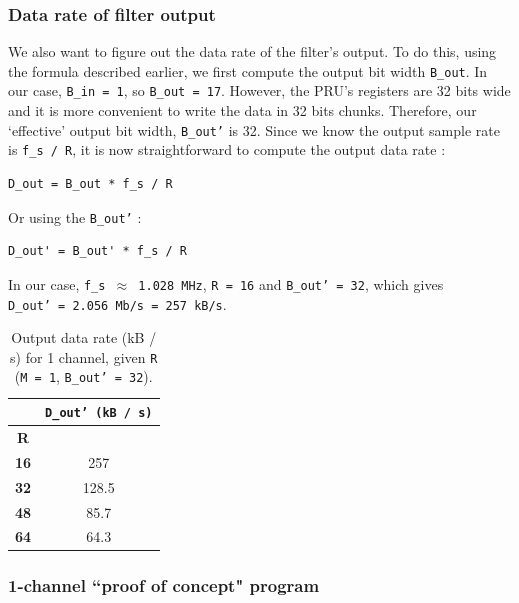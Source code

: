 \documentclass[]{report}
\begin{document}
\subsubsection{Data rate of filter output}

We also want to figure out the data rate of the filter's output. To do
this, using the formula described earlier, we first compute the output
bit width \texttt{B\_out}. In our case, \texttt{B\_in\ =\ 1}, so
\texttt{B\_out\ =\ 17}. However, the PRU's registers are 32 bits wide
and it is more convenient to write the data in 32 bits chunks.
Therefore, our `effective' output bit width,
\texttt{B\_out'} is 32. Since we know the output sample
rate is \texttt{f\_s\ /\ R}, it is now straightforward to compute the
output data rate :

\begin{verbatim}
D_out = B_out * f_s / R
\end{verbatim}

\noindent Or using the \texttt{B\_out'} :

\begin{verbatim}
D_out' = B_out' * f_s / R
\end{verbatim}

\noindent In our case, \texttt{f\_s\ $ \approx $ 1.028\ MHz},
\texttt{R\ =\ 16} and \texttt{B\_out'\ =\ 32}, which
gives \texttt{D\_out'\ =\ 2.056\ Mb/s\ =\ 257~kB/s}.

\begin {table}[H]
\begin{center}
\begin{tabular}{|c|c|}
	\hline  & \textbf{\texttt{D\_out'\ (kB\ /\ s)}} \\ 
	\hline \textbf{R} &  \\ 
	\hline \textbf{16} & 257 \\ 
	\hline \textbf{32} & 128.5 \\ 
	\hline \textbf{48} & 85.7 \\ 
	\hline \textbf{64} & 64.3 \\ 
	\hline 
\end{tabular} 
\caption{Output data rate (kB / s) for 1 channel,
	given \texttt{R} (\texttt{M\ =\ 1},
	\texttt{B\_out'\ =\ 32}).}
\end{center}
\end{table}



\hypertarget{channel-proof-of-concept-program}{%
\subsubsection{1-channel ``proof of concept"
program}\label{channel-proof-of-concept-program}}
\end{document}
